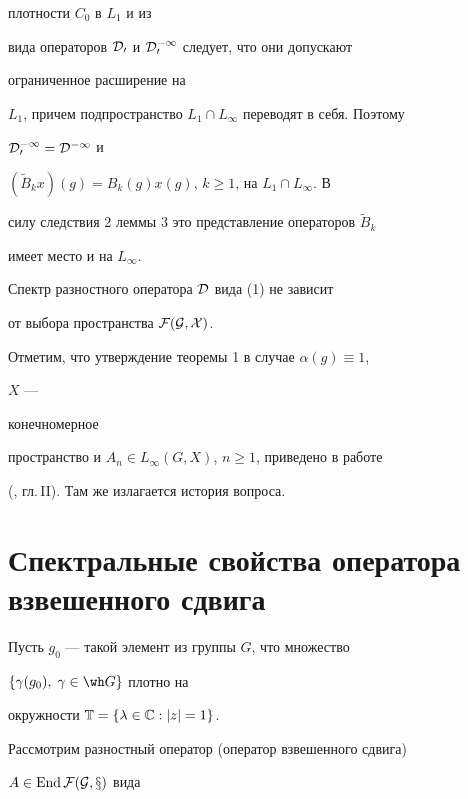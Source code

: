 \begin{pf}
плотности $C_0$ в $L_1$ и из 


вида операторов $\cal D_0$ и $\cal D_0^{-1}$ следует, что они допускают 


ограниченное расширение на 


$L_1$, причем подпространство $L_1\cap L_\infty$ переводят в себя. Поэтому 


$\cal D_0^{-1}=\cal D^{-1}$ и 


$(\widetilde B_kx)(g)=B_k(g)x(g)$, $k\ge 1$, на $L_1\cap L_\infty$. В 


силу следствия 2 леммы 3 это представление операторов $\widetilde B_k$ 


имеет место и на $L_\infty$. 


\end{pf} 


 


\begin{cornonum} Спектр разностного оператора $\cal D$ вида (1) не зависит 


от выбора пространства $\cal F(G,X)$. 


\end{cornonum} 


 


Отметим, что утверждение теоремы 1 в случае $\alpha(g)\equiv 1$, 


$X$ --- 


конечномерное 


пространство и $A_n\in L_\infty(G,X)$, $n\ge 1$, приведено в работе 


(\cite{Kur}, гл.\,II). Там же излагается история вопроса. 


 


\section{Спектральные свойства оператора взвешенного сдвига} 


 


Пусть $g_0$ --- такой элемент из группы $G$, что множество 


$\{\gamma(g_0),\;\gamma\in\wh G\}$ плотно на 


окружности $\Bbb T=\{\lambda\in\Bbb C:|z|=1\}$. 


Рассмотрим разностный оператор (оператор взвешенного сдвига) 


$A\in\operatorname{End}\cal F(G,x)$ вида 


